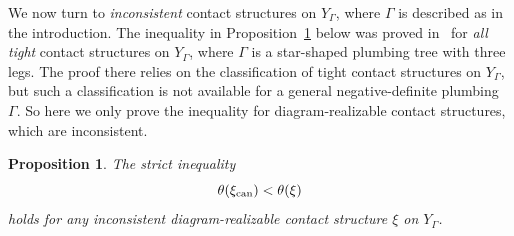 \documentclass[11pt]{amsart}
\theoremstyle{plain}
\newtheorem{proposition}[theorem]{Proposition}
\theoremstyle{definition}
\theoremstyle{remark}
\begin{document}
We now turn to \emph{inconsistent} contact structures on $Y_\Gamma$,
where $\Gamma$ is described as in the introduction. The inequality in
Proposition~\ref{prop:minimum} below was proved
in~\cite[Proposition~1.7]{EtnyreOzbagciTosun2025} for \emph{all
tight} contact structures on $Y_\Gamma$, where $\Gamma$ is a
star-shaped plumbing tree with three legs. The proof there relies on
the classification of tight contact structures on $Y_\Gamma$, but
such a classification is not available for a general
negative-definite plumbing $\Gamma$. So here we only prove the
inequality for diagram-realizable contact structures, which are
inconsistent.

\begin{proposition}\label{prop:minimum}
The strict inequality
\[
\theta(\xi_{\rm can})<\theta(\xi)
\]
holds for any inconsistent diagram-realizable contact structure $\xi$
on $Y_\Gamma$.
\end{proposition}
\end{document}
